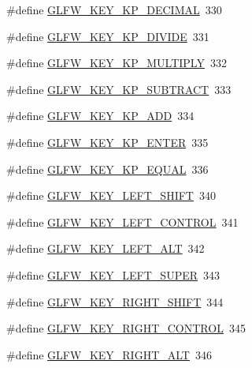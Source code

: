 \begin{DoxyCompactItemize}
\item 
\#define \mbox{\hyperlink{group__keys_ga4e231d968796331a9ea0dbfb98d4005b}{G\+L\+F\+W\+\_\+\+K\+E\+Y\+\_\+\+K\+P\+\_\+\+D\+E\+C\+I\+M\+AL}}~330
\item 
\#define \mbox{\hyperlink{group__keys_gabca1733780a273d549129ad0f250d1e5}{G\+L\+F\+W\+\_\+\+K\+E\+Y\+\_\+\+K\+P\+\_\+\+D\+I\+V\+I\+DE}}~331
\item 
\#define \mbox{\hyperlink{group__keys_ga9ada267eb0e78ed2ada8701dd24a56ef}{G\+L\+F\+W\+\_\+\+K\+E\+Y\+\_\+\+K\+P\+\_\+\+M\+U\+L\+T\+I\+P\+LY}}~332
\item 
\#define \mbox{\hyperlink{group__keys_gaa3dbd60782ff93d6082a124bce1fa236}{G\+L\+F\+W\+\_\+\+K\+E\+Y\+\_\+\+K\+P\+\_\+\+S\+U\+B\+T\+R\+A\+CT}}~333
\item 
\#define \mbox{\hyperlink{group__keys_gad09c7c98acc79e89aa6a0a91275becac}{G\+L\+F\+W\+\_\+\+K\+E\+Y\+\_\+\+K\+P\+\_\+\+A\+DD}}~334
\item 
\#define \mbox{\hyperlink{group__keys_ga4f728f8738f2986bd63eedd3d412e8cf}{G\+L\+F\+W\+\_\+\+K\+E\+Y\+\_\+\+K\+P\+\_\+\+E\+N\+T\+ER}}~335
\item 
\#define \mbox{\hyperlink{group__keys_gaebdc76d4a808191e6d21b7e4ad2acd97}{G\+L\+F\+W\+\_\+\+K\+E\+Y\+\_\+\+K\+P\+\_\+\+E\+Q\+U\+AL}}~336
\item 
\#define \mbox{\hyperlink{group__keys_ga8a530a28a65c44ab5d00b759b756d3f6}{G\+L\+F\+W\+\_\+\+K\+E\+Y\+\_\+\+L\+E\+F\+T\+\_\+\+S\+H\+I\+FT}}~340
\item 
\#define \mbox{\hyperlink{group__keys_ga9f97b743e81460ac4b2deddecd10a464}{G\+L\+F\+W\+\_\+\+K\+E\+Y\+\_\+\+L\+E\+F\+T\+\_\+\+C\+O\+N\+T\+R\+OL}}~341
\item 
\#define \mbox{\hyperlink{group__keys_ga7f27dabf63a7789daa31e1c96790219b}{G\+L\+F\+W\+\_\+\+K\+E\+Y\+\_\+\+L\+E\+F\+T\+\_\+\+A\+LT}}~342
\item 
\#define \mbox{\hyperlink{group__keys_gafb1207c91997fc295afd1835fbc5641a}{G\+L\+F\+W\+\_\+\+K\+E\+Y\+\_\+\+L\+E\+F\+T\+\_\+\+S\+U\+P\+ER}}~343
\item 
\#define \mbox{\hyperlink{group__keys_gaffca36b99c9dce1a19cb9befbadce691}{G\+L\+F\+W\+\_\+\+K\+E\+Y\+\_\+\+R\+I\+G\+H\+T\+\_\+\+S\+H\+I\+FT}}~344
\item 
\#define \mbox{\hyperlink{group__keys_gad1ca2094b2694e7251d0ab1fd34f8519}{G\+L\+F\+W\+\_\+\+K\+E\+Y\+\_\+\+R\+I\+G\+H\+T\+\_\+\+C\+O\+N\+T\+R\+OL}}~345
\item 
\#define \mbox{\hyperlink{group__keys_ga687b38009131cfdd07a8d05fff8fa446}{G\+L\+F\+W\+\_\+\+K\+E\+Y\+\_\+\+R\+I\+G\+H\+T\+\_\+\+A\+LT}}~346

\end{DoxyCompactItemize}
